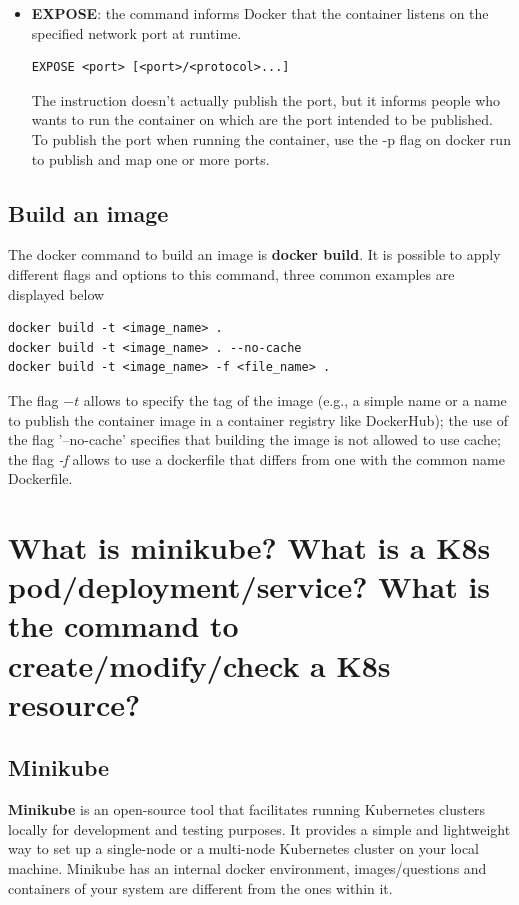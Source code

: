 \begin{itemize}
   \item \textbf{EXPOSE}: the command informs Docker that the container listens on the specified network port at runtime.
         \begin{verbatim}
EXPOSE <port> [<port>/<protocol>...]
    \end{verbatim}
         The instruction doesn't actually publish the port, but it informs people who wants to run the container on which are the port intended to be published. To publish the port when running the container, use the -p flag on docker run to publish and map one or more ports.
\end{itemize}

\subsection{Build an image}
The docker command to build an image is \textbf{docker build}. It is possible to apply different flags and options to this command, three common examples are displayed below
\begin{verbatim}
docker build -t <image_name> .
docker build -t <image_name> . --no-cache
docker build -t <image_name> -f <file_name> .
\end{verbatim}
The flag $-t$ allows to specify the tag of the image (e.g., a simple name or a name to publish the container image in a container registry like DockerHub); the use of the flag '--no-cache' specifies that building the image is not allowed to use cache; the flag \emph{-f} allows to use a dockerfile that differs from one with the common name Dockerfile.
\section{What is minikube? What is a K8s pod/deployment/service? What is the command to create/modify/check a K8s resource?}
\subsection{Minikube}
\textbf{Minikube} is an open-source tool that facilitates running Kubernetes clusters locally for development and testing purposes. It provides a simple and lightweight way to set up a single-node or a multi-node Kubernetes cluster on your local machine. 
Minikube has an internal docker environment, images/questions and containers of your system are different from the ones within it.

